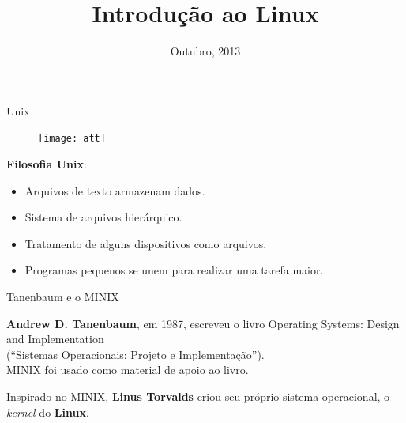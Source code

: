 \documentclass[size=14pt,
style=paintings
]{powerdot}
\title{Introdução ao Linux}
\date{Outubro, 2013}
\newenvironment{vslide}{\vspace{\stretch{1}}}{\vspace{\stretch{1}}}
\begin{document}
\maketitle

\begin{slide}{Unix}
{
   \begin{figure}[!h]
  \texttt{[image: att]}  
   \end{figure}
}

\textbf{Filosofia Unix}:
\begin{itemize}
\item Arquivos de texto armazenam dados.
\item Sistema de arquivos hierárquico.
\item Tratamento de alguns dispositivos como arquivos.
\item Programas pequenos se unem para realizar uma tarefa maior.
\end{itemize}
\end{slide}

\begin{slide}{Tanenbaum e o MINIX}

\begin{vslide}
\textbf{Andrew D. Tanenbaum}, em 1987, escreveu o livro {\color{blue}Operating Systems: Design and Implementation}\\ (``Sistemas Operacionais: Projeto e Implementação'').
\\
\vspace{.5cm}
MINIX foi usado como material de apoio ao livro.

\vspace{0.5cm}
Inspirado no MINIX, \textbf{Linus Torvalds} criou seu próprio sistema operacional, o \textit{kernel} do \textbf{Linux}.
\vspace{0.5cm}
\end{vslide}

\end{slide}
\end{document}
